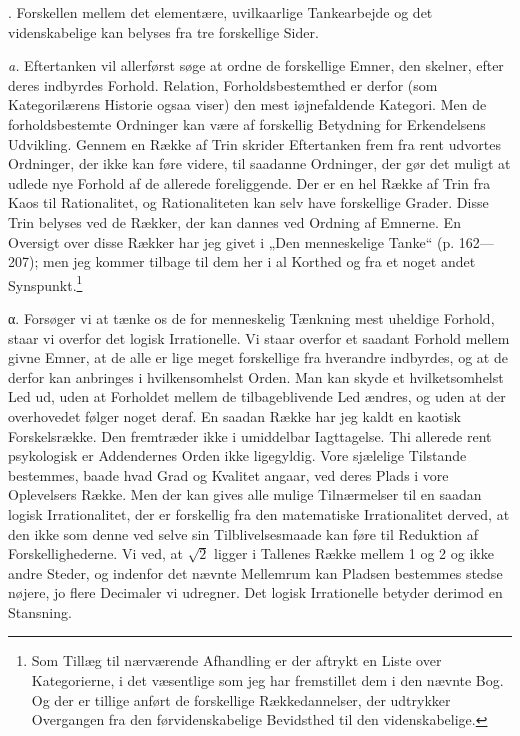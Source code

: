 \documentclass[12pt]{article}
\newcommand{\opage}[1]{\marginnote{\footnotesize\textit{[#1]}}}
\begin{document}
. Forskellen mellem det elementære, uvilkaarlige Tankearbejde og det
videnskabelige kan belyses fra tre forskellige Sider.

\textit{a.} Eftertanken vil allerførst søge at ordne de forskellige Emner, den
skelner, efter deres indbyrdes Forhold. Relation, Forholdsbestemthed er derfor
(som Kategorilærens Historie ogsaa viser) den mest iøjnefaldende Kategori. Men
de forholdsbestemte Ordninger kan være af forskellig Betydning for Erkendelsens
Udvikling. Gennem en Række af Trin skrider Eftertanken frem fra rent udvortes
Ordninger, der ikke kan føre videre, til saadanne Ordninger, der gør det muligt
at udlede nye Forhold af de allerede foreliggende. Der er en hel Række af Trin
fra Kaos til Rationalitet, og Rationaliteten kan selv have forskellige Grader.
Disse Trin belyses ved de Rækker, der kan dannes ved Ordning af Emnerne. En
Oversigt over
\setcounter{footnote}{0}%
\opage{9}disse Rækker har jeg givet i „Den menneskelige Tanke“ (p. 162---207);
men jeg kommer tilbage til dem her i al Korthed og fra et noget andet
Synspunkt.\footnote{Som Tillæg til nærværende Afhandling er der aftrykt en
Liste over Kategorierne, i det væsentlige som jeg har fremstillet dem i den
nævnte Bog. Og der er tillige anført de forskellige Rækkedannelser, der
udtrykker Overgangen fra den førvidenskabelige Bevidsthed til den
videnskabelige.}

α. Forsøger vi at tænke os de for menneskelig Tænkning mest uheldige Forhold,
staar vi overfor det logisk Irrationelle. Vi staar overfor et saadant Forhold
mellem givne Emner, at de alle er lige meget forskellige fra hverandre
indbyrdes, og at de derfor kan anbringes i hvilkensomhelst Orden. Man kan skyde
et hvilketsomhelst Led ud, uden at Forholdet mellem de tilbageblivende Led
ændres, og uden at der overhovedet følger noget deraf. En saadan Række har jeg
kaldt en kaotisk Forskelsrække. Den fremtræder ikke i umiddelbar Iagttagelse.
Thi allerede rent psykologisk er Addendernes Orden ikke ligegyldig. Vore
sjælelige Tilstande bestemmes, baade hvad Grad og Kvalitet angaar, ved deres
Plads i vore Oplevelsers Række. Men der kan gives alle mulige Tilnærmelser til
en saadan logisk Irrationalitet, der er forskellig fra den matematiske
Irrationalitet derved, at den ikke som denne ved selve sin Tilblivelsesmaade
kan føre til Reduktion af Forskellighederne. Vi ved, at $\sqrt{2}$ ligger i
Tallenes Række mellem 1 og 2 og ikke andre Steder, og indenfor det nævnte
Mellemrum kan Pladsen bestemmes stedse nøjere, jo flere Decimaler vi udregner.
Det logisk Irrationelle betyder derimod en Stansning.
\end{document}

